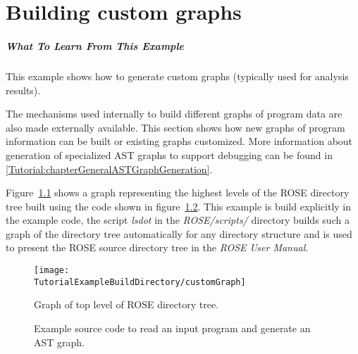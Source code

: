 \chapter{Building custom graphs}
\label{Tutorial:chapterCustomGraphs}

\paragraph{What To Learn From This Example}
This example shows how to generate custom graphs (typically used for analysis results).

     The mechanisms used internally to build different graphs of program data
are also made externally available. This section shows how new graphs of 
program information can be built or existing graphs customized.
More information about generation of specialized AST graphs to support debugging 
can be found in \ref{Tutorial:chapterGeneralASTGraphGeneration}.

Figure~\ref{tutorial:exampleCustomGraph} shows a graph representing the
highest levels of the ROSE directory tree built using the code shown
in figure~\ref{Tutorial:exampleCustomGraphCode}.  This example is build
explicitly in the example code, the script {\em lsdot} in the 
{\em ROSE/scripts/} directory builds such a graph of the directory tree 
automatically for any directory structure and is used to present the ROSE 
source directory tree in the {\em ROSE User Manual}.


\begin{figure}[!h]
\texttt{[image: \\TutorialExampleBuildDirectory/customGraph]}
\caption{Graph of top level of ROSE directory  tree.}
\label{tutorial:exampleCustomGraph}
\end{figure}



\begin{figure}[!h]
{\indent
{\mySmallFontSize

\begin{latexonly}
   
\end{latexonly}

\begin{htmlonly}
   
\end{htmlonly}

}
}
\caption{Example source code to read an input program and generate an AST graph.}
\label{Tutorial:exampleCustomGraphCode}
\end{figure}


